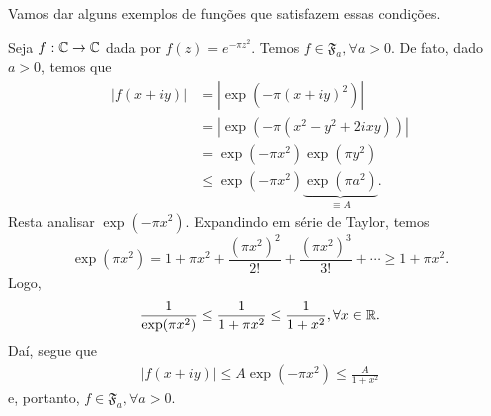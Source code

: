        Vamos dar alguns exemplos de funções que satisfazem essas condições.
        \begin{exemplo}
            Seja $f:\mathbb{C}\to\mathbb{C}$ dada por $f(z) = e^{-\pi z^2}$. Temos $f\in\mathfrak{F}_a, \forall a>0$.
            De fato, dado $a>0$, temos que
            \begin{align*}
                |f(x+iy)| &= |\exp(-\pi(x+iy)^2)| \\
                          &= |\exp(-\pi(x^2-y^2+2ixy))| \\
                          &= \exp(-\pi x^2)\exp(\pi y^2) \\
                          &\leq \exp(-\pi x^2)\underbrace{\exp(\pi a^2)}_{\equiv A}.
            \end{align*}
            Resta analisar $\exp(-\pi x^2)$. Expandindo em série de Taylor, temos
            \begin{equation*}
                \exp(\pi x^2) = 1 + \pi x^2 + \frac{(\pi x^2)^2}{2!} + \frac{(\pi x^2)^3}{3!} + \cdots
                              \geq 1 + \pi x^2.
            \end{equation*}
            Logo,
            \begin{equation*}
                \frac{1}{\exp(\pi x^2)}\leq\frac{1}{1+\pi x^2}\leq\frac{1}{1+x^2},\forall x\in\mathbb{R}.
            \end{equation*}
            Daí, segue que
            \begin{align*}
                |f(x+iy)| \leq A\exp(-\pi x^2) \leq \frac{A}{1+x^2}
            \end{align*}
            e, portanto, $f\in\mathfrak{F}_a, \forall a>0$.
        \end{exemplo}
